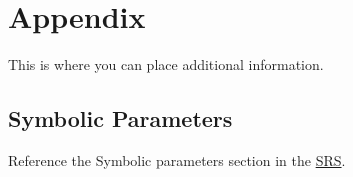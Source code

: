 \documentclass[12pt, titlepage]{article}
\begin{document}
		
		
		
		
		
		
		
		
		
		
		
		
	
	
	
	
	
	
	
	
	
	\section{Appendix}
	
	This is where you can place additional information.
	
	\subsection{Symbolic Parameters}
	
	Reference the Symbolic parameters section in the \href{https://github.com/RutheniumVI/UnderTree/blob/main/docs/SRS/SRS.pdf}{SRS}. 
	
\end{document}
